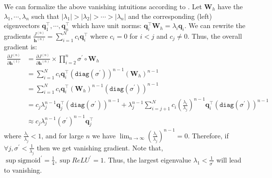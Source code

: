 We can formalize the above vanishing intuitions according to .
Let $\bm{W}_h$ have the  $\lambda_1, \cdots, \lambda_n$ such that $|\lambda_1| > |\lambda_2| > \cdots > |\lambda_n|$ and the corresponding (left) eigenvectors $\bm{q}_1^\top, \cdots, \bm{q}_n^\top$ which have unit norms: $\bm{q}_i^\top \bm{W}_h = \lambda_i \bm{q}_i$.
We can rewrite the gradients $\frac{J^{(n)}}{\bm{h}^{(n)}} = \sum_{i=1}^N c_i \bm{q}_i^\top$ where $c_i = 0$ for $i < j$ and $c_j \ne 0$.
Thus, the overall gradient is:
\begin{align}
\frac{\partial J^{(n)}}{\partial \bm{h}^{(1)}} &= \frac{\partial J^{(n)}}{\partial \bm{h}^{(n)}} \times \prod_{i=2}^n \sigma^\prime \circ \bm{W}_h \nonumber \\ 
&= \sum_{i=1}^N c_i \bm{q}_i^\top (\texttt{diag}(\sigma^\prime))^{n-1} (\bm{W}_h)^{n-1} \nonumber \\
&= \sum_{i=1}^N c_i \bm{q}_i^\top (\bm{W}_h)^{n-1} (\texttt{diag}(\sigma^\prime))^{n-1} \nonumber \\
&= c_j \lambda_j^{n-1} \bm{q}_j^\top (\texttt{diag}(\sigma^\prime))^{n-1} + \lambda_j^{n-1} \sum_{i=j+1}^N c_i \left(\frac{\lambda_i}{\lambda_j}\right)^{n-1} \bm{q}_i^\top  (\texttt{diag}(\sigma^\prime))^{n-1} \nonumber \nonumber \\
&\approx c_j \lambda_j^{n-1} (\sigma^\prime)^{n-1} \bm{q}_j^\top \nonumber
\end{align}
where $\frac{\lambda_i}{\lambda_j} < 1$, and for large $n$ we have $\lim_{n \to \infty} \left(\frac{\lambda_i}{\lambda_j}\right)^{n-1} = 0$.
Therefore, if $\forall j, \sigma^\prime < \frac{1}{\lambda_j}$ then we get vanishing gradient.
Note that, $\sup \text{sigmoid}^\prime = \frac{1}{4}, \sup ReLU^\prime = 1$.
Thus, the largest eigenvalue $\lambda_1 < \frac{1}{\sigma^\prime}$ will lead to vanishing.

